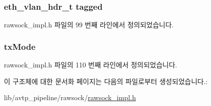 \subsubsection[{\texorpdfstring{tagged}{tagged}}]{\setlength{\rightskip}{0pt plus 5cm}eth\+\_\+vlan\+\_\+hdr\+\_\+t tagged}\hypertarget{structbase__rawsock_ab46e7821537b027ee4346ea3c812f07d}{}\label{structbase__rawsock_ab46e7821537b027ee4346ea3c812f07d}


rawsock\+\_\+impl.\+h 파일의 99 번째 라인에서 정의되었습니다.

\subsubsection[{\texorpdfstring{tx\+Mode}{txMode}}]{ tx\+Mode}\hypertarget{structbase__rawsock_a15ac92f42c8328bb63a903014e00dda0}{}\label{structbase__rawsock_a15ac92f42c8328bb63a903014e00dda0}


rawsock\+\_\+impl.\+h 파일의 110 번째 라인에서 정의되었습니다.



이 구조체에 대한 문서화 페이지는 다음의 파일로부터 생성되었습니다.\+:\begin{DoxyCompactItemize}
\item 
lib/avtp\+\_\+pipeline/rawsock/\hyperlink{rawsock__impl_8h}{rawsock\+\_\+impl.\+h}\end{DoxyCompactItemize}
